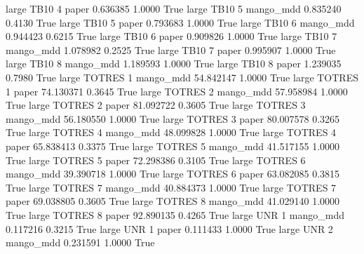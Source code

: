      large     TB10                 4                 paper      0.636385      1.0000    True
     large     TB10                 5             mango_mdd      0.835240      0.4130    True
     large     TB10                 5                 paper      0.793683      1.0000    True
     large     TB10                 6             mango_mdd      0.944423      0.6215    True
     large     TB10                 6                 paper      0.909826      1.0000    True
     large     TB10                 7             mango_mdd      1.078982      0.2525    True
     large     TB10                 7                 paper      0.995907      1.0000    True
     large     TB10                 8             mango_mdd      1.189593      1.0000    True
     large     TB10                 8                 paper      1.239035      0.7980    True
     large   TOTRES                 1             mango_mdd     54.842147      1.0000    True
     large   TOTRES                 1                 paper     74.130371      0.3645    True
     large   TOTRES                 2             mango_mdd     57.958984      1.0000    True
     large   TOTRES                 2                 paper     81.092722      0.3605    True
     large   TOTRES                 3             mango_mdd     56.180550      1.0000    True
     large   TOTRES                 3                 paper     80.007578      0.3265    True
     large   TOTRES                 4             mango_mdd     48.099828      1.0000    True
     large   TOTRES                 4                 paper     65.838413      0.3375    True
     large   TOTRES                 5             mango_mdd     41.517155      1.0000    True
     large   TOTRES                 5                 paper     72.298386      0.3105    True
     large   TOTRES                 6             mango_mdd     39.390718      1.0000    True
     large   TOTRES                 6                 paper     63.082085      0.3815    True
     large   TOTRES                 7             mango_mdd     40.884373      1.0000    True
     large   TOTRES                 7                 paper     69.038805      0.3605    True
     large   TOTRES                 8             mango_mdd     41.029140      1.0000    True
     large   TOTRES                 8                 paper     92.890135      0.4265    True
     large      UNR                 1             mango_mdd      0.117216      0.3215    True
     large      UNR                 1                 paper      0.111433      1.0000    True
     large      UNR                 2             mango_mdd      0.231591      1.0000    True
